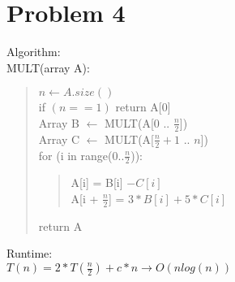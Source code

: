 \documentclass[11pt,letter]{article}
\newcommand{\2}{\{0, 1\}}
\newcommand{\1}{\mathds{1}}
\theoremstyle{definition}
\begin{document}
\section*{Problem 4}

Algorithm:\\
MULT(array A): 
\begin{quote}
	$n \leftarrow A.size()$\\
	if $(n == 1)$ return A[0]\\
	Array B $\leftarrow$ MULT(A[0 .. $\frac{n}{2}$])\\
	Array C $\leftarrow$ MULT(A[$\frac{n}{2} + 1$ .. $n$])\\
	
	for (i in range(0..$\frac{n}{2}$)):
	\begin{quote}
		A[i] = B[i] $-C[i]$ \\
		A[i + $\frac{n}{2}$] = $3 * B[i] + 5 * C[i]$
	\end{quote}
	return A
\end{quote}

Runtime: \\
$T(n) = 2 * T(\frac{n}{2}) + c*n \rightarrow O(nlog(n))$\\
\end{document}
